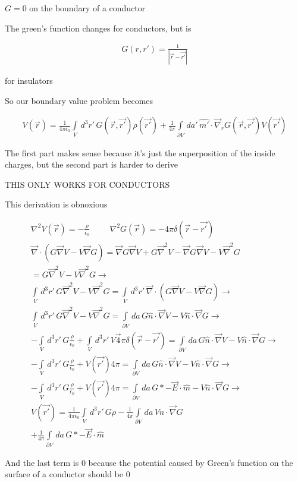 \documentclass[fleqn]{report}
\newcommand{\hp}{\hspace{1cm}}
\newcommand{\del}{\partial}
\newcommand{\equations} [1] {
\begin{gather*}
#1
\end{gather*}
}
\begin{document}
$G = 0$ on the boundary of a conductor 

The green's function changes for conductors, but is 
\equations{
    G(r, r') = \frac{1}{|\vec{r} - \vec{r'}|}
}
for insulators 

So our boundary value problem becomes 
\equations{
    V(\vec r)
    =
    \frac{1}{4 \pi \epsilon_0}
    \int\limits_V \, d^3 r' \, 
    G(\vec{r}, \vec{r'})
    \rho(\vec{r'})
    +
    \frac{1}{4 \pi}
    \int\limits_{\del V} \, da' \, 
    \hat{m'} \cdot \vec{\nabla}_r 
    G(\vec{r}, \vec{r'})
    V(\vec{r'})
}
The first part makes sense because it's just the superposition of the inside 
charges, but the second part is harder to derive 

THIS ONLY WORKS FOR CONDUCTORS

This derivation is obnoxious 
\equations{
    \nabla^2 V(\vec r) = -\frac{\rho}{\epsilon_0}
    \hp 
    \nabla^2 G(\vec r) = - 4 \pi \delta(\vec r - \vec{r'})
    \\
    \vec \nabla \cdot 
    \left( G \vec \nabla V - V \vec \nabla G \right)
    =
    \vec \nabla G \vec \nabla V + G \vec \nabla^2 V
    -
    \vec \nabla G \vec \nabla V - V \vec \nabla^2 G
    \\
    =
    G \vec \nabla^2 V
    - V \vec \nabla^2 G
    \rightarrow 
    \\
    \int\limits_V \, d^3 r' \, 
    G \vec \nabla^2 V
    - V \vec \nabla^2 G
    =
    \int\limits_V \, d^3 r' \, 
    \vec \nabla \cdot 
    \left( G \vec \nabla V - V \vec \nabla G \right)
    \rightarrow 
    \\
    \int\limits_V \, d^3 r' \, 
    G \vec \nabla^2 V
    - V \vec \nabla^2 G
    =
    \int\limits_{\del V} \, da \, 
    G \hat n \cdot \vec \nabla V - V \hat n \cdot \vec \nabla G
    \rightarrow 
    \\
    -\int\limits_V \, d^3 r' \, 
    G \frac{\rho}{\epsilon_0}
    +
    \int\limits_V \, d^3 r' \, 
    V \vec 4 \pi \delta(\vec r - \vec{r'})
    =
    \int\limits_{\del V} \, da \, 
    G \hat n \cdot \vec \nabla V - V \hat n \cdot \vec \nabla G
    \rightarrow 
    \\
    -\int\limits_V \, d^3 r' \, 
    G \frac{\rho}{\epsilon_0}
    +
    V(\vec{r'}) 4 \pi
    =
    \int\limits_{\del V} \, da \, 
    G \hat n \cdot \vec \nabla V - V \hat n \cdot \vec \nabla G
    \rightarrow 
    \\
    -\int\limits_V \, d^3 r' \, 
    G \frac{\rho}{\epsilon_0}
    +
    V(\vec{r'}) 4 \pi
    =
    \int\limits_{\del V} \, da \, 
    G * - \vec E \cdot \hat m - V \hat n \cdot \vec \nabla G
    \rightarrow 
    \\
    V(\vec{r'})
    =
    \frac{1}{4 \pi \epsilon_0}
    \int\limits_V \, d^3 r' \, 
    G \rho
    - 
    \frac{1}{4 \pi}
    \int\limits_{\del V} \, da \, 
    V \hat n \cdot \vec \nabla G
    \\
    +
    \frac{1}{4 \pi}
    \int\limits_{\del V} \, da \, 
    G * - \vec E \cdot \hat m 
}
And the last term is $0$ because the potential caused by Green's function 
on the surface of a conductor should be 0
\end{document}
